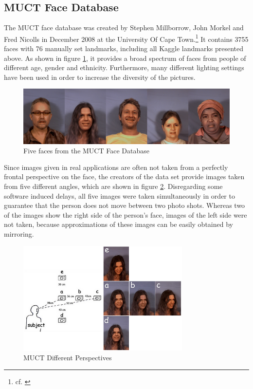 \documentclass[11pt, a4paper]{article}
\begin{document}
\subsection{MUCT Face Database}

The \acf{MUCT} face database was created by Stephen Millborrow, John Morkel and Fred Nicolls in December 2008 at the University Of Cape Town.\footnote{cf. \cite{muct}} It contains 3755 faces with 76 manually set landmarks, including all Kaggle landmarks presented above. As shown in figure \ref{fig:muctfaces}, it provides a broad spectrum of faces from people of different age, gender and ethnicity. Furthermore, many different lighting settings have been used in order to increase the diversity of the pictures.

\begin{figure}[htbp]
	\centering
	\includegraphics[width=\textwidth]{muct_faces.png}
	\caption{Five faces from the MUCT Face Database}
	\label{fig:muctfaces}
\end{figure}

Since images given in real applications are often not taken from a perfectly frontal perspective on the face, the creators of the data set provide images taken from five different angles, which are shown in figure \ref{fig:muctangles}. Disregarding some software induced delays, all five images were taken simultaneously in order to guarantee that the person does not move between two photo shots. Whereas two of the images show the right side of the person's face, images of the left side were not taken, because approximations of these images can be easily obtained by mirroring.

\begin{figure}[htbp]
	\centering
	\includegraphics[width=0.77\textwidth]{muct_perspectives.png}
	\caption[MUCT Different Perspectives]{MUCT Different Perspectives\footnotemark}
	\label{fig:muctangles}
\end{figure}
\end{document}
